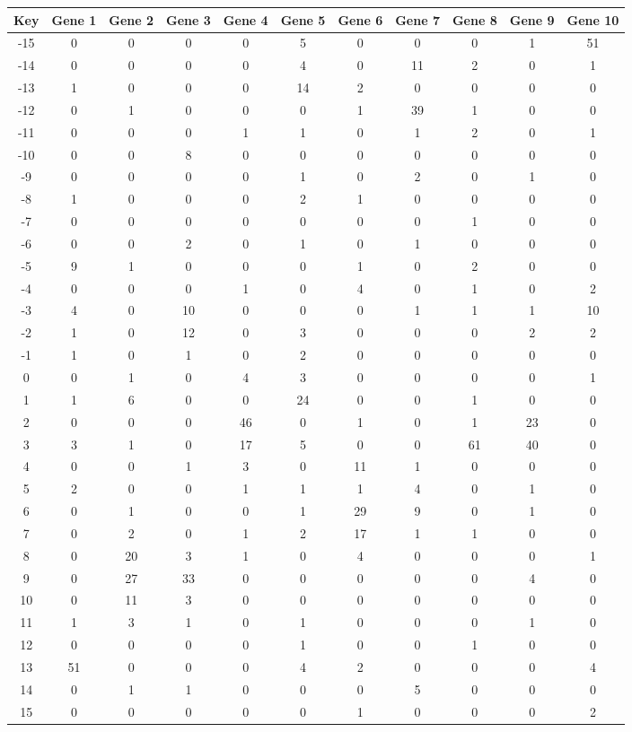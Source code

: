 \begin{tabular}{|c|c|c|c|c|c|c|c|c|c|c|}
\hline
Key & Gene 1 & Gene 2 & Gene 3 & Gene 4 & Gene 5 & Gene 6 & Gene 7 & Gene 8 & Gene 9 & Gene 10 \\
\hline
-15 & 0 & 0 & 0 & 0 & 5 & 0 & 0 & 0 & 1 & 51 \\
-14 & 0 & 0 & 0 & 0 & 4 & 0 & 11 & 2 & 0 & 1 \\
-13 & 1 & 0 & 0 & 0 & 14 & 2 & 0 & 0 & 0 & 0 \\
-12 & 0 & 1 & 0 & 0 & 0 & 1 & 39 & 1 & 0 & 0 \\
-11 & 0 & 0 & 0 & 1 & 1 & 0 & 1 & 2 & 0 & 1 \\
-10 & 0 & 0 & 8 & 0 & 0 & 0 & 0 & 0 & 0 & 0 \\
-9 & 0 & 0 & 0 & 0 & 1 & 0 & 2 & 0 & 1 & 0 \\
-8 & 1 & 0 & 0 & 0 & 2 & 1 & 0 & 0 & 0 & 0 \\
-7 & 0 & 0 & 0 & 0 & 0 & 0 & 0 & 1 & 0 & 0 \\
-6 & 0 & 0 & 2 & 0 & 1 & 0 & 1 & 0 & 0 & 0 \\
-5 & 9 & 1 & 0 & 0 & 0 & 1 & 0 & 2 & 0 & 0 \\
-4 & 0 & 0 & 0 & 1 & 0 & 4 & 0 & 1 & 0 & 2 \\
-3 & 4 & 0 & 10 & 0 & 0 & 0 & 1 & 1 & 1 & 10 \\
-2 & 1 & 0 & 12 & 0 & 3 & 0 & 0 & 0 & 2 & 2 \\
-1 & 1 & 0 & 1 & 0 & 2 & 0 & 0 & 0 & 0 & 0 \\
0 & 0 & 1 & 0 & 4 & 3 & 0 & 0 & 0 & 0 & 1 \\
1 & 1 & 6 & 0 & 0 & 24 & 0 & 0 & 1 & 0 & 0 \\
2 & 0 & 0 & 0 & 46 & 0 & 1 & 0 & 1 & 23 & 0 \\
3 & 3 & 1 & 0 & 17 & 5 & 0 & 0 & 61 & 40 & 0 \\
4 & 0 & 0 & 1 & 3 & 0 & 11 & 1 & 0 & 0 & 0 \\
5 & 2 & 0 & 0 & 1 & 1 & 1 & 4 & 0 & 1 & 0 \\
6 & 0 & 1 & 0 & 0 & 1 & 29 & 9 & 0 & 1 & 0 \\
7 & 0 & 2 & 0 & 1 & 2 & 17 & 1 & 1 & 0 & 0 \\
8 & 0 & 20 & 3 & 1 & 0 & 4 & 0 & 0 & 0 & 1 \\
9 & 0 & 27 & 33 & 0 & 0 & 0 & 0 & 0 & 4 & 0 \\
10 & 0 & 11 & 3 & 0 & 0 & 0 & 0 & 0 & 0 & 0 \\
11 & 1 & 3 & 1 & 0 & 1 & 0 & 0 & 0 & 1 & 0 \\
12 & 0 & 0 & 0 & 0 & 1 & 0 & 0 & 1 & 0 & 0 \\
13 & 51 & 0 & 0 & 0 & 4 & 2 & 0 & 0 & 0 & 4 \\
14 & 0 & 1 & 1 & 0 & 0 & 0 & 5 & 0 & 0 & 0 \\
15 & 0 & 0 & 0 & 0 & 0 & 1 & 0 & 0 & 0 & 2 \\
\hline
\end{tabular}